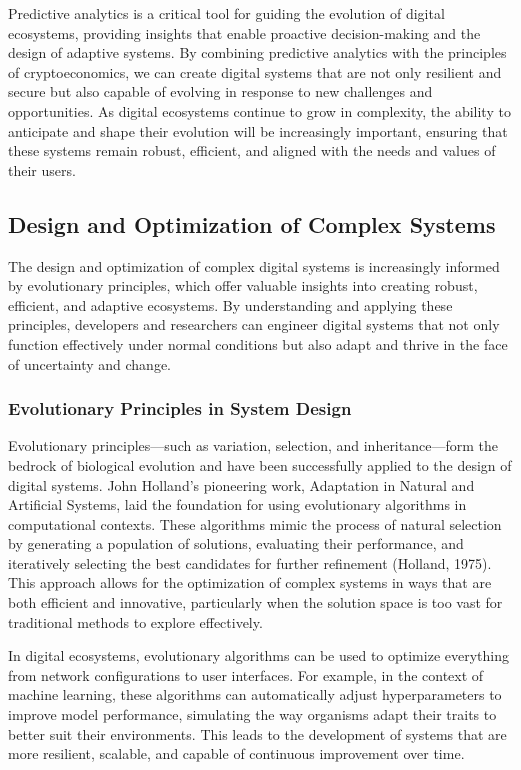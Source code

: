 \documentclass[12pt,twoside]{article}
\begin{document}
Predictive analytics is a critical tool for guiding the evolution of digital ecosystems, providing insights that enable proactive decision-making and the design of adaptive systems. By combining predictive analytics with the principles of cryptoeconomics, we can create digital systems that are not only resilient and secure but also capable of evolving in response to new challenges and opportunities. As digital ecosystems continue to grow in complexity, the ability to anticipate and shape their evolution will be increasingly important, ensuring that these systems remain robust, efficient, and aligned with the needs and values of their users.

\subsection{Design and Optimization of Complex Systems}

The design and optimization of complex digital systems is increasingly informed by evolutionary principles, which offer valuable insights into creating robust, efficient, and adaptive ecosystems. By understanding and applying these principles, developers and researchers can engineer digital systems that not only function effectively under normal conditions but also adapt and thrive in the face of uncertainty and change.


\subsubsection{Evolutionary Principles in System Design}

Evolutionary principles—such as variation, selection, and inheritance—form the bedrock of biological evolution and have been successfully applied to the design of digital systems. John Holland’s pioneering work, Adaptation in Natural and Artificial Systems, laid the foundation for using evolutionary algorithms in computational contexts. These algorithms mimic the process of natural selection by generating a population of solutions, evaluating their performance, and iteratively selecting the best candidates for further refinement (Holland, 1975). This approach allows for the optimization of complex systems in ways that are both efficient and innovative, particularly when the solution space is too vast for traditional methods to explore effectively.

In digital ecosystems, evolutionary algorithms can be used to optimize everything from network configurations to user interfaces. For example, in the context of machine learning, these algorithms can automatically adjust hyperparameters to improve model performance, simulating the way organisms adapt their traits to better suit their environments. This leads to the development of systems that are more resilient, scalable, and capable of continuous improvement over time.
\end{document}
